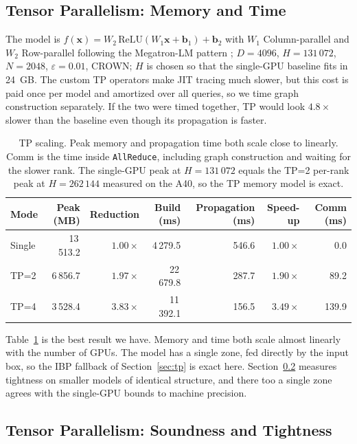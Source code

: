 \documentclass[runningheads]{llncs}
\begin{document}
\subsection{Tensor Parallelism: Memory and Time}
\label{sec:exp-tp}

The model is $f(\mathbf{x}) = W_2\,\mathrm{ReLU}(W_1\mathbf{x} + \mathbf{b}_1) +
\mathbf{b}_2$ with $W_1$ Column-parallel and $W_2$ Row-parallel following the
Megatron-LM pattern \cite{MegatronLM2020}; $D{=}4096$, $H{=}131\,072$,
$N{=}2048$, $\varepsilon{=}0.01$, CROWN; $H$ is chosen so that the single-GPU
baseline fits in 24~GB. The custom TP operators make JIT tracing much slower,
but this cost is paid once per model and amortized over all queries, so we time
graph construction separately. If the two were timed together, TP would look
$4.8\times$ slower than the baseline even though its propagation is faster.

\begin{table}[t]
\caption{TP scaling. Peak memory and propagation time both scale close to linearly. Comm is the time inside \texttt{AllReduce}, including graph construction and waiting for the slower rank. The single-GPU peak at $H{=}131\,072$ equals the TP=2 per-rank peak at $H{=}262\,144$ measured on the A40, so the TP memory model is exact.}
\label{tab:tp-scaling}
\small
\centering
\begin{tabular}{lrrrrrr}
\toprule
Mode & Peak (MB) & Reduction & Build (ms) & Propagation (ms) & Speed-up & Comm (ms) \\
\midrule
Single & 13\,513.2 & $1.00\times$ &  4\,279.5 & 546.6 & $1.00\times$ &   0.0 \\
TP=2   &  6\,856.7 & $1.97\times$ & 22\,679.8 & 287.7 & $1.90\times$ &  89.2 \\
TP=4   &  3\,528.4 & $3.83\times$ & 11\,392.1 & 156.5 & $3.49\times$ & 139.9 \\
\bottomrule
\end{tabular}
\end{table}

Table~\ref{tab:tp-scaling} is the best result we have. Memory and time both
scale almost linearly with the number of GPUs. The model has a single zone, fed
directly by the input box, so the IBP fallback of Section~\ref{sec:tp} is exact
here. Section~\ref{sec:exp-tp2} measures tightness on smaller models of
identical structure, and there too a single zone agrees with the single-GPU
bounds to machine precision.

\subsection{Tensor Parallelism: Soundness and Tightness}
\label{sec:exp-tp2}
\end{document}
